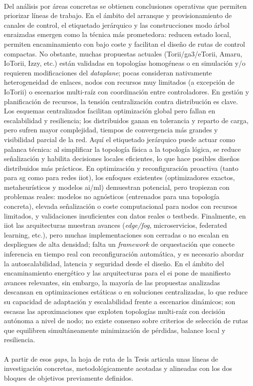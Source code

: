 \\
Del análisis por áreas concretas se obtienen conclusiones operativas que permiten priorizar líneas de trabajo. En el ámbito del arranque y provisionamiento de canales de control, el etiquetado jerárquico y las construcciones modo árbol enraizadas emergen como la técnica más prometedora: reducen estado local, permiten encaminamiento con bajo coste y facilitan el diseño de rutas de control compactas. No obstante, muchas propuestas actuales (Torii/\gls{ga3}/eTorii, Amaru, IoTorii, Izzy, etc.) están validadas en topologías homogéneas o en simulación y/o requieren modificaciones del \textit{dataplane}; pocas consideran nativamente heterogeneidad de enlaces, nodos con recursos muy limitados (a excepción de IoTorii) o escenarios multi-raíz con coordinación entre controladores. En gestión y planificación de recursos, la tensión centralización contra distribución es clave. Los esquemas centralizados facilitan optimización global pero fallan en escalabilidad y resiliencia; los distribuidos ganan en tolerancia y reparto de carga, pero sufren mayor complejidad, tiempos de convergencia más grandes y visibilidad parcial de la red. Aquí el etiquetado jerárquico puede actuar como palanca técnica: al simplificar la topología física a la topología lógica, se reduce señalización y habilita decisiones locales eficientes, lo que hace posibles diseños distribuidos más prácticos. En optimización y reconfiguración proactiva (tanto para \gls{sg} como para redes \gls{iiot}), los enfoques existentes (optimizadores exactos, metaheurísticos y modelos \gls{ai}/\gls{ml}) demuestran potencial, pero tropiezan con problemas reales: modelos no agnósticos (entrenados para una topología concreta), elevada señalización o coste computacional para nodos con recursos limitados, y validaciones insuficientes con datos reales o testbeds. Finalmente, en \gls{iiot} las arquitecturas muestran avances (\textit{edge/fog}, microservicios, federated learning, etc.), pero muchas implementaciones son cerradas o no escalan en despliegues de alta densidad; falta un \textit{framework} de orquestación que conecte inferencia en tiempo real con reconfiguración automática, y es necesario abordar la autoscalabilidad, latencia y seguridad desde el diseño. En el ámbito del encaminamiento energético y las arquitecturas para el \gls{ei} pone de manifiesto avances relevantes, sin embargo, la mayoría de las propuestas analizadas descansan en optimizaciones estáticas o en soluciones centralizadas, lo que reduce su capacidad de adaptación y escalabilidad frente a escenarios dinámicos; son escasas las aproximaciones que exploten topologías multi-raíz con decisión autónoma a nivel de nodo; no existe consenso sobre criterios de selección de rutas que equilibren simultáneamente minimización de pérdidas, balance local y resiliencia.\\
\\
A partir de esos \textit{gaps}, la hoja de ruta de la Tesis articula unas líneas de investigación concretas, metodológicamente acotadas y alineadas con los dos bloques de objetivos previamente definidos.

